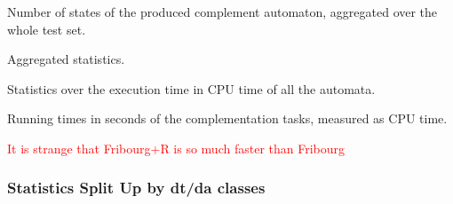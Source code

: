 Number of states of the produced complement automaton, aggregated over the whole test set.

\begin{table}[ht]
\centering

\caption{Aggregated statistics.}
\end{table}

Statistics over the execution time in CPU time of all the automata.

\begin{table}[ht]
\centering

\caption{Running times in seconds of the complementation tasks, measured as CPU time.}
\end{table}

\textcolor{red}{It is strange that Fribourg+R is so much faster than Fribourg}

\subsubsection{Statistics Split Up by dt/da classes}

\newcommand{\perspwidth}{0.475}

